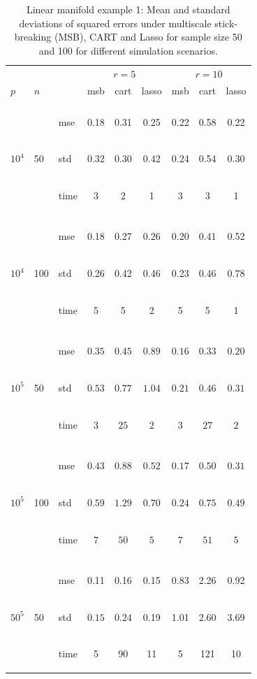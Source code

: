 \documentclass{article} %
\newcommand{\efoo}{\end{footnotesize}}
\newcommand{\bfoo}{\begin{footnotesize}}
\begin{document}
\begin{table}[t]
\caption{Linear manifold example 1: Mean and standard deviations of squared errors under multiscale stick-breaking (MSB), CART and Lasso for sample size 50 and 100 for different simulation scenarios.}\label{table:linear1}
\vskip 0.15in
\begin{center}
\begin{small}
\begin{sc}
\begin{tabular}{lllcccccc}
\hline
&&&\multicolumn{3}{c}{$r=5$}&\multicolumn{3}{c}{$r=10$}\\
$p$&$n$& & msb&cart&lasso & msb&cart&lasso \\
\\
\multirow{3}{*}{$10^4$}&\multirow{3}{*}{50}&\bfoo mse\efoo&0.18&0.31&0.25&0.22&0.58&0.22\\
&&\bfoo std\efoo &0.32&0.30&0.42&0.24&0.54&0.30\\
&&\bfoo time\efoo &3&2&1&3&3&1\\

\\
\multirow{3}{*}{$10^4$}&\multirow{3}{*}{100}&\bfoo mse\efoo&0.18&0.27&0.26&0.20&0.41&0.52\\
&&\bfoo std\efoo & 0.26&0.42&0.46&0.23&0.46&0.78\\
&&\bfoo time\efoo &5&5& 2&5&5&1\\

\\
\multirow{3}{*}{$10^5$}&\multirow{3}{*}{50}&\bfoo mse\efoo&$0.35$&$0.45$&$0.89$&$0.16$&$0.33$&$0.20$\\
&&\bfoo std\efoo &$0.53$ &$0.77$&$1.04$&$0.21$&$0.46$&$0.31$\\
&&\bfoo time\efoo &$3$&$25$&$2$&$3$&$27$&$2$\\
\\
\multirow{3}{*}{$10^5$}&\multirow{3}{*}{100}&\bfoo mse\efoo&$0.43$&$0.88$&$0.52$&$0.17$&$0.50$&$0.31$\\
&&\bfoo std\efoo &$0.59$ &$1.29$&$0.70$&$0.24$ &$0.75$&$0.49$\\
&&\bfoo time\efoo &$7$&$50$&$5$&$7$&$51$&$5$\\
\\
\multirow{3}{*}{$50^5$}&\multirow{3}{*}{50}&\bfoo mse\efoo&0.11&0.16&0.15&0.83&2.26&0.92\\
&&\bfoo std\efoo&$0.15$ &0.24&0.19&1.01&2.60&3.69\\
&&\bfoo time\efoo &5&90&11&5&121&10\\



\end{tabular}
\end{sc}
\end{small}
\end{center}
\end{table}
\end{document}
